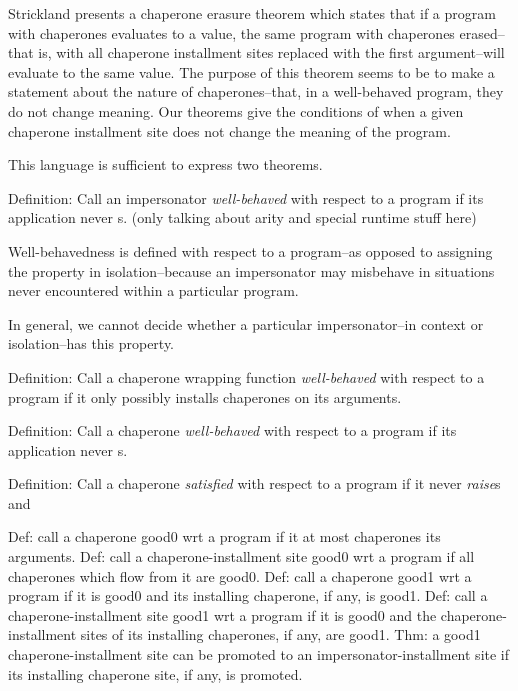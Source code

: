 \documentclass{sigplanconf}
\begin{document}
Strickland presents a chaperone erasure theorem which states that if a program with chaperones evaluates to a value, the same program with chaperones erased--that is, with all chaperone installment sites replaced with the first argument--will evaluate to the same value. The purpose of this theorem seems to be to make a statement about the nature of chaperones--that, in a well-behaved program, they do not change meaning. Our theorems give the conditions of when a given chaperone installment site does not change the meaning of the program.

This language is sufficient to express two theorems.

Definition: Call an impersonator \emph{well-behaved} with respect to a program if its application never s.
(only talking about arity and special runtime stuff here)

Well-behavedness is defined with respect to a program--as opposed to assigning the property in isolation--because an impersonator may misbehave in situations never encountered within a particular program.

In general, we cannot decide whether a particular impersonator--in context or isolation--has this property.

Definition: Call a chaperone wrapping function \emph{well-behaved} with respect to a program if it only possibly installs chaperones on its arguments.

Definition: Call a chaperone \emph{well-behaved} with respect to a program if its application never s.

Definition: Call a chaperone \emph{satisfied} with respect to a program if it never \emph{raise}s and 

Def: call a chaperone good0 wrt a program if it at most chaperones its arguments.
Def: call a chaperone-installment site good0 wrt a program if all chaperones which flow from it are good0.
Def: call a chaperone good1 wrt a program if it is good0 and its installing chaperone, if any, is good1.
Def: call a chaperone-installment site good1 wrt a program if it is good0 and the chaperone-installment sites of its installing chaperones, if any, are good1.
Thm: a good1 chaperone-installment site can be promoted to an impersonator-installment site if its installing chaperone site, if any, is promoted.


\end{document}
